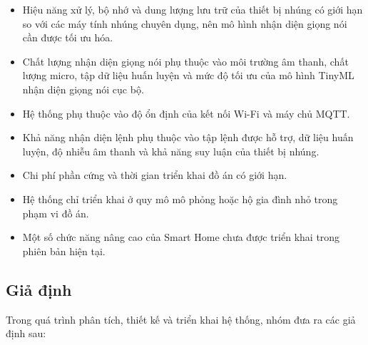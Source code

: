 \documentclass[a4paper,12pt]{article}
\begin{document}
\begin{itemize}
\item Hiệu năng xử lý, bộ nhớ và dung lượng lưu trữ của thiết bị nhúng có giới hạn so với các máy tính nhúng chuyên dụng, nên mô hình nhận diện giọng nói cần được tối ưu hóa.

\item Chất lượng nhận diện giọng nói phụ thuộc vào môi trường âm thanh, chất lượng micro, tập dữ liệu huấn luyện và mức độ tối ưu của mô hình TinyML nhận diện giọng nói cục bộ.

\item Hệ thống phụ thuộc vào độ ổn định của kết nối Wi-Fi và máy chủ MQTT.

\item Khả năng nhận diện lệnh phụ thuộc vào tập lệnh được hỗ trợ, dữ liệu huấn luyện, độ nhiễu âm thanh và khả năng suy luận của thiết bị nhúng.

\item Chi phí phần cứng và thời gian triển khai đồ án có giới hạn.

\item Hệ thống chỉ triển khai ở quy mô mô phỏng hoặc hộ gia đình nhỏ trong phạm vi đồ án.

\item Một số chức năng nâng cao của Smart Home chưa được triển khai trong phiên bản hiện tại.

\end{itemize}

\subsection{Giả định}

Trong quá trình phân tích, thiết kế và triển khai hệ thống, nhóm đưa ra các giả định sau:
\end{document}
